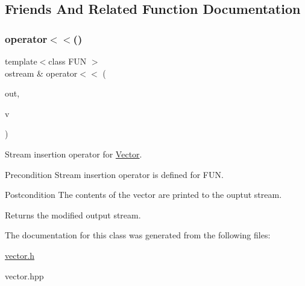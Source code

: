 \subsection{Friends And Related Function Documentation}
\mbox{\label{classVector_acdb80390f6795111ddcd4ab48dc902b2}} 
\subsubsection{\texorpdfstring{operator$<$$<$()}{operator<<()}}
{\footnotesize\ttfamily template$<$class F\+UN $>$ \\
ostream \& operator$<$$<$ (\begin{DoxyParamCaption}\item[{ostream \&}]{out,  }\item[{const \hyperlink{classVector}{Vector}$<$ F\+UN $>$ \&}]{v }\end{DoxyParamCaption})\hspace{0.3cm}{\ttfamily [related]}}



Stream insertion operator for {\ttfamily \hyperlink{classVector}{Vector}}. 

\begin{DoxyPrecond}{Precondition}
Stream insertion operator is defined for {\ttfamily F\+UN}. 
\end{DoxyPrecond}
\begin{DoxyPostcond}{Postcondition}
The contents of the vector are printed to the ouptut stream. 
\end{DoxyPostcond}
\begin{DoxyReturn}{Returns}
the modified output stream. 
\end{DoxyReturn}


The documentation for this class was generated from the following files\+:\begin{DoxyCompactItemize}
\item 
\hyperlink{vector_8h}{vector.\+h}\item 
vector.\+hpp\end{DoxyCompactItemize}
